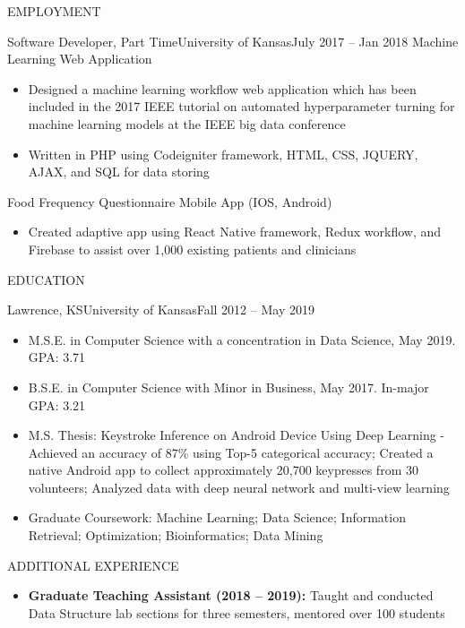 \documentclass[]{mcdowellcv}
\begin{document}
\begin{cvsection}{EMPLOYMENT}
		\begin{cvsubsection}{Software Developer, Part Time}{University of Kansas}{July 2017 -- Jan 2018}
			Machine Learning Web Application
			\begin{itemize}
				\item Designed a machine learning workflow web application which has been included in the 2017 IEEE tutorial on automated hyperparameter turning for machine learning models at the IEEE big data conference
				\item Written in PHP using Codeigniter framework, HTML, CSS, JQUERY, AJAX, and SQL for data storing
			\end{itemize}
			Food Frequency Questionnaire Mobile App (IOS, Android)
			\begin{itemize}
				\item Created adaptive app using React Native framework, Redux workflow, and Firebase to assist over 1,000 existing patients and clinicians
			\end{itemize}
		\end{cvsubsection}
	\end{cvsection}

	\begin{cvsection}{EDUCATION}
		\begin{cvsubsection}{Lawrence, KS}{University of Kansas}{Fall 2012 -- May 2019}
			\begin{itemize}
				\item M.S.E. in Computer Science with a concentration in Data Science, May 2019. GPA: 3.71
				\item B.S.E. in Computer Science with Minor in Business, May 2017. In-major GPA: 3.21
				\item M.S. Thesis: Keystroke Inference on Android Device Using Deep Learning - Achieved an accuracy of 87\% using Top-5 categorical accuracy; Created a native Android app to collect approximately 20,700 keypresses from 30 volunteers; Analyzed data with deep neural network and multi-view learning
				\item Graduate Coursework: Machine Learning; Data Science; Information Retrieval; Optimization; Bioinformatics; Data Mining
			\end{itemize}
		\end{cvsubsection}
	\end{cvsection}

	\begin{cvsection}{ADDITIONAL EXPERIENCE}
		\begin{cvsubsection}{}{}{}
			\begin{itemize}
				\item \textbf{Graduate Teaching Assistant (2018 – 2019):} Taught and conducted Data Structure lab sections for three semesters, mentored over 100 students
			\end{itemize}
		\end{cvsubsection}
	\end{cvsection}
\end{document}
